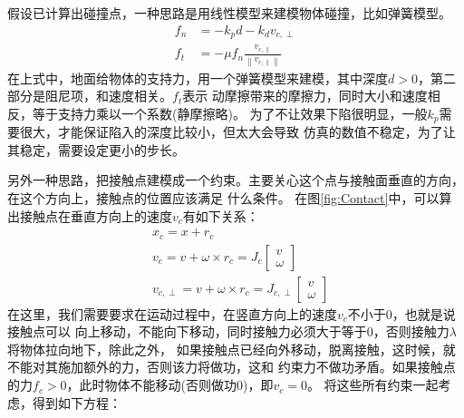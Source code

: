 \documentclass[lang=cn,newtx,10pt,scheme=chinese]{elegantbook}
\begin{document}
假设已计算出碰撞点，一种思路是用线性模型来建模物体碰撞，比如弹簧模型。
\begin{equation}
  \begin{aligned}
  f_n & =-k_p d-k_d v_{c, \perp} \\
  f_t & =-\mu f_n \frac{v_{c, \|}}{\left\|v_{c, \|}\right\|}
  \end{aligned}
\end{equation}
在上式中，地面给物体的支持力，用一个弹簧模型来建模，其中深度$d>0$，第二部分是阻尼项，和速度相关。$f_t$表示
动摩擦带来的摩擦力，同时大小和速度相反，等于支持力乘以一个系数(静摩擦略)。
为了不让效果下陷很明显，一般$k_p$需要很大，才能保证陷入的深度比较小，但太大会导致
仿真的数值不稳定，为了让其稳定，需要设定更小的步长。

另外一种思路，把接触点建模成一个约束。主要关心这个点与接触面垂直的方向，在这个方向上，接触点的位置应该满足
什么条件。
在图\ref{fig:Contact}中，可以算出接触点在垂直方向上的速度$v_c$有如下关系：
\begin{equation}
  \begin{aligned}
  & x_c=x+r_c \\
  & v_c=v+\omega \times r_c=J_c\left[\begin{array}{l}
  v \\
  \omega
  \end{array}\right] \\
  & v_{c, \perp}=v+\omega \times r_c=J_{c, \perp}\left[\begin{array}{l}
  v \\
  \omega
  \end{array}\right]
  \end{aligned}
\end{equation}
在这里，我们需要要求在运动过程中，在竖直方向上的速度$v_c$不小于0，也就是说接触点可以
向上移动，不能向下移动，同时接触力必须大于等于0，否则接触力$\lambda$将物体拉向地下，除此之外，
如果接触点已经向外移动，脱离接触，这时候，就不能对其施加额外的力，否则该力将做功，这和
约束力不做功矛盾。如果接触点的力$f_c>0$，此时物体不能移动(否则做功0)，即$v_c = 0$。
将这些所有约束一起考虑，得到如下方程：
\end{document}
